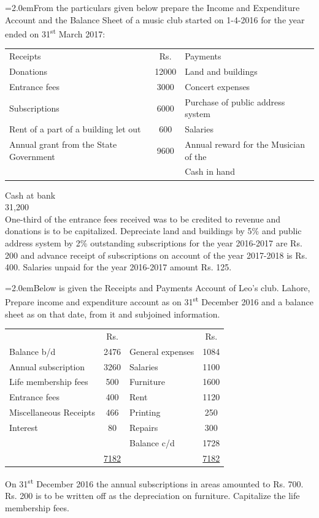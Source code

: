 \documentclass[11pt,a4paper]{article}
\newcommand{\lqn}[2]{\Needspace{6\baselineskip}\par\medskip\noindent\hangindent=2.0em\hangafter=1\makebox[2.0em][l]{\textbf{#1.}}#2\par}
\begin{document}
\lqn{22}{From the particulars given below prepare the Income and Expenditure Account and the Balance Sheet of a music club started on 1-4-2016 for the year ended on 31\textsuperscript{st}  March 2017:\par
\par\smallskip\noindent\hspace*{1.2em}\begin{tabular}{lcl}
Receipts & Rs. & Payments \\
Donations & 12000 & Land and buildings \\
Entrance fees & 3000 & Concert expenses \\
Subscriptions & 6000 & Purchase of public address system \\
Rent of a part of a building let out & 600 & Salaries \\
Annual grant from the State Government & 9600 & Annual reward for the Musician of the \\
 &  & Cash in hand \\
\end{tabular}\par\smallskip
Cash at bank\\
31,200\\
One-third of the entrance fees received was to be credited to revenue and donations is to be capitalized. Depreciate land and buildings by 5\% and public address system by 2\% outstanding subscriptions for the year 2016-2017 are Rs. 200 and advance receipt of subscriptions on account of the year 2017-2018 is Rs. 400. Salaries unpaid for the year 2016-2017 amount Rs. 125.\par
}
\lqn{23}{Below is given the Receipts and Payments Account of Leo’s club. Lahore, Prepare income and expenditure account as on 31\textsuperscript{st}  December 2016 and a balance sheet as on that date, from it and subjoined information.\par
\par\smallskip\noindent\hspace*{1.2em}\begin{tabular}{|lclc|}
\hline
 & Rs. &  & Rs. \\
Balance b/d & 2476 & General expenses & 1084 \\
Annual subscription & 3260 & Salaries & 1100 \\
Life membership fees & 500 & Furniture & 1600 \\
Entrance fees & 400 & Rent & 1120 \\
Miscellaneous Receipts & 466 & Printing & 250 \\
Interest & 80 & Repairs & 300 \\
 &  & Balance c/d & 1728 \\
 & \underline{7182} &  & \underline{7182} \\
\hline
\end{tabular}\par\smallskip
On 31\textsuperscript{st}  December 2016 the annual subscriptions in areas amounted to Rs. 700. Rs. 200 is to be written off as the depreciation on furniture. Capitalize the life membership fees.\par
}
\end{document}
